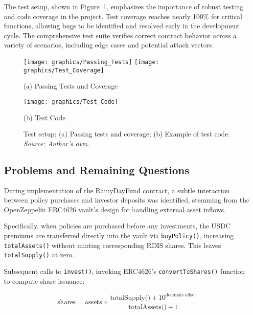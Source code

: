 \documentclass[11pt,a4paper]{article}
\begin{document}
		The test setup, shown in Figure~\ref{fig:test-set-up}, emphasizes the importance of robust testing and code coverage in the project. 
		Test coverage reaches nearly 100\% for critical functions, allowing bugs to be identified and resolved early in the development cycle. 
		The comprehensive test suite verifies correct contract behavior across a variety of scenarios, including edge cases and potential attack vectors. 

		\begin{figure}[!htbp]
			\centering
			\begin{minipage}[b]{0.48\textwidth}
				\centering
				\texttt{[image: graphics/Passing\_Tests]}
				\texttt{[image: graphics/Test\_Coverage]}
				\caption*{(a) Passing Tests and Coverage}
			\end{minipage}\hfill
			\begin{minipage}[b]{0.48\textwidth}
				\centering
				\texttt{[image: graphics/Test\_Code]}
				\caption*{(b) Test Code}
			\end{minipage}
			\caption{Test setup: (a) Passing tests and coverage; (b) Example of test code. \textit{Source: Author's own.}}
			\label{fig:test-set-up}
		\end{figure}

    \FloatBarrier

    \subsection{Problems and Remaining Questions}\label{subsec:problems-and-remaining-questions}

        During implementation of the RainyDayFund contract, a subtle interaction between policy purchases and investor deposits was identified, stemming from the OpenZeppelin ERC4626 vault's design for handling external asset inflows.

        Specifically, when policies are purchased before any investments, the USDC premiums are transferred directly into the vault via \texttt{buyPolicy()}, increasing \texttt{totalAssets()} without minting corresponding RDIS shares.
        This leaves \texttt{totalSupply()} at zero.

        Subsequent calls to \texttt{invest()}, invoking ERC4626's \texttt{convertToShares()} function to compute share issuance:

        \[
        \text{shares} = \text{assets} \times \frac{\text{totalSupply()} + 10^{\text{decimals offset}}}{\text{totalAssets()} + 1}
        \]
\end{document}
